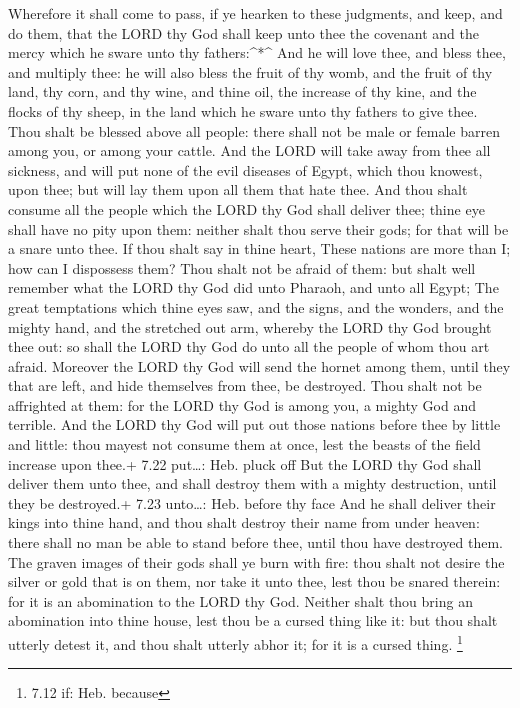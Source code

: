  Wherefore it shall come to pass, if ye hearken to these
judgments, and keep, and do them, that the LORD thy God shall keep unto
thee the covenant and the mercy which he sware unto thy
fathers:\^{}*\^{}  And he will love thee, and bless thee,
and multiply thee: he will also bless the fruit of thy womb, and the
fruit of thy land, thy corn, and thy wine, and thine oil, the increase
of thy kine, and the flocks of thy sheep, in the land which he sware
unto thy fathers to give thee.  Thou shalt be blessed above
all people: there shall not be male or female barren among you, or among
your cattle.  And the LORD will take away from thee all
sickness, and will put none of the evil diseases of Egypt, which thou
knowest, upon thee; but will lay them upon all them that hate thee.
 And thou shalt consume all the people which the LORD thy
God shall deliver thee; thine eye shall have no pity upon them: neither
shalt thou serve their gods; for that will be a snare unto thee.
 If thou shalt say in thine heart, These nations are more
than I; how can I dispossess them?  Thou shalt not be
afraid of them: but shalt well remember what the LORD thy God did unto
Pharaoh, and unto all Egypt;  The great temptations which
thine eyes saw, and the signs, and the wonders, and the mighty hand, and
the stretched out arm, whereby the LORD thy God brought thee out: so
shall the LORD thy God do unto all the people of whom thou art afraid.
 Moreover the LORD thy God will send the hornet among them,
until they that are left, and hide themselves from thee, be destroyed.
 Thou shalt not be affrighted at them: for the LORD thy God
is among you, a mighty God and terrible.  And the LORD thy
God will put out those nations before thee by little and little: thou
mayest not consume them at once, lest the beasts of the field increase
upon thee.+ 7.22 put\ldots: Heb. pluck off  But the LORD
thy God shall deliver them unto thee, and shall destroy them with a
mighty destruction, until they be destroyed.+ 7.23 unto\ldots: Heb.
before thy face  And he shall deliver their kings into
thine hand, and thou shalt destroy their name from under heaven: there
shall no man be able to stand before thee, until thou have destroyed
them.  The graven images of their gods shall ye burn with
fire: thou shalt not desire the silver or gold that is on them, nor take
it unto thee, lest thou be snared therein: for it is an abomination to
the LORD thy God.  Neither shalt thou bring an abomination
into thine house, lest thou be a cursed thing like it: but thou shalt
utterly detest it, and thou shalt utterly abhor it; for it is a cursed
thing. \footnote{7.12 if: Heb. because}

